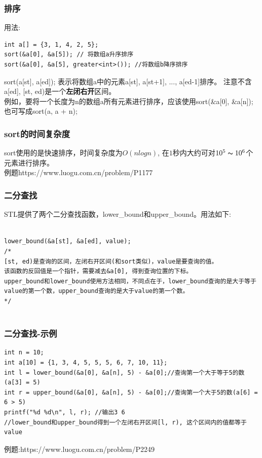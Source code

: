 \documentclass{beamer}
\begin{document}
\begin{frame}[fragile]
    \frametitle{排序}
    用法: \\
    \begin{lstlisting}
int a[] = {3, 1, 4, 2, 5};
sort(&a[0], &a[5]); // 将数组a升序排序
sort(&a[0], &a[5], greater<int>()); //将数组b降序排序
    \end{lstlisting} 
    sort(a[st], a[ed]); 表示将数组a中的元素a[st], a[st+1], ..., a[ed-1]排序。
    注意不含a[ed], [st, ed)是一个\textbf{左闭右开}区间。\\
    例如，要将一个长度为n的数组a所有元素进行排序，应该使用sort(\&a[0], \&a[n]);\\
    也可写成sort(a, a + n);

\end{frame}

\begin{frame}
    \frametitle{sort的时间复杂度}
    sort使用的是快速排序，时间复杂度为$O(nlogn)$, 在$1$秒内大约可对$10^5 \thicksim  10^6$个元素进行排序。\\
    例题https://www.luogu.com.cn/problem/P1177

\end{frame}

\begin{frame}[fragile]
    \frametitle{二分查找}
    STL提供了两个二分查找函数，lower\_bound和upper\_bound。用法如下:\\
    \begin{lstlisting}

lower_bound(&a[st], &a[ed], value);
/*
[st, ed)是查询的区间，左闭右开区间(和sort类似)，value是要查询的值。
该函数的反回值是一个指针，需要减去&a[0], 得到查询位置的下标。
upper_bound和lower_bound使用方法相同，不同点在于，lower_bound查询的是大于等于value的第一个数，upper_bound查询的是大于value的第一个数。
*/


    \end{lstlisting}
    

\end{frame}

\begin{frame}[fragile]
    \frametitle{二分查找-示例}
    \begin{lstlisting}
int n = 10;
int a[10] = {1, 3, 4, 5, 5, 5, 6, 7, 10, 11};
int l = lower_bound(&a[0], &a[n], 5) - &a[0];//查询第一个大于等于5的数 (a[3] = 5)
int r = upper_bound(&a[0], &a[n], 5) - &a[0];//查询第一个大于5的数(a[6] = 6 > 5)
printf("%d %d\n", l, r); //输出3 6
//lower_bound和upper_bound得到一个左闭右开区间[l, r), 这个区间内的值都等于value

    \end{lstlisting}

    例题:https://www.luogu.com.cn/problem/P2249

\end{frame}
\end{document}

